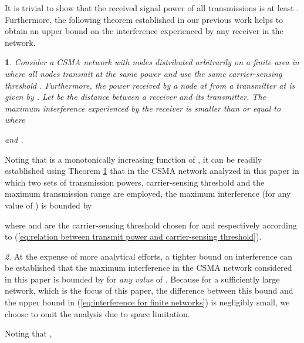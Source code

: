 \documentclass[english]{IEEEtran}
\theoremstyle{plain}
\newtheorem{thm}{\protect\theoremname}
\theoremstyle{plain}
\theoremstyle{plain}
\theoremstyle{remark}
\newtheorem{rem}[thm]{\protect\remarkname}
\providecommand{\remarkname}{Remark}
\providecommand{\theoremname}{Theorem}
\begin{document}
It is trivial to show that the received signal power of all transmissions
is at least . Furthermore, the following theorem established
in our previous work \cite[Theorem 1]{Yang12Connectivity} helps to
obtain an upper bound on the interference experienced by any receiver
in the network.
\begin{thm}
\label{thm:interference homogeneous CSMA}Consider a CSMA network
with nodes distributed arbitrarily on a finite area in 
where all nodes transmit at the same power  and use the same carrier-sensing
threshold . Furthermore, the power received by a node at 
from a transmitter at  is given by .
Let  be the distance between a receiver and its transmitter.
The maximum interference experienced by the receiver is smaller than
or equal to  where




and .
\end{thm}
Noting that  is a monotonically increasing
function of , it can be readily established using Theorem
\ref{thm:interference homogeneous CSMA} that in the CSMA network
analyzed in this paper in which two sets of transmission powers, carrier-sensing
threshold and the maximum transmission range are employed, the maximum
interference (for any value of ) is bounded by

where  and  are the carrier-sensing threshold chosen
for  and  respectively according to (\ref{eq:relation between transmit power and carrier-sensing threshold}). 
\begin{rem}
At the expense of more analytical efforts, a tighter bound on interference
can be established that the maximum interference in the CSMA network
considered in this paper is bounded by 
for \emph{any value} of . Because for a sufficiently large network,
which is the focus of this paper, the difference between this bound
and the upper bound in (\ref{eq:interference for finite networks})
is negligibly small, we choose to omit the analysis due to space limitation.
\end{rem}
Noting that ,
\end{document}
